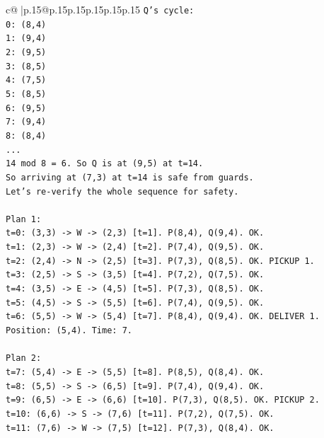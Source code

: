 \documentclass{article}
\begin{document}
{\begin{supertabular}{c@{$\;$}|p{.15\linewidth}@{}p{.15\linewidth}p{.15\linewidth}p{.15\linewidth}p{.15\linewidth}p{.15\linewidth}}
{{{\texttt{Q's cycle:} \\
\texttt{0: (8,4)} \\
\texttt{1: (9,4)} \\
\texttt{2: (9,5)} \\
\texttt{3: (8,5)} \\
\texttt{4: (7,5)} \\
\texttt{5: (8,5)} \\
\texttt{6: (9,5)} \\
\texttt{7: (9,4)} \\
\texttt{8: (8,4)} \\
\texttt{...} \\
\texttt{14 mod 8 = 6. So Q is at (9,5) at t=14.} \\
\texttt{So arriving at (7,3) at t=14 is safe from guards.} \\
\texttt{Let's re{-}verify the whole sequence for safety.} \\
\\ 
\texttt{Plan 1:} \\
\texttt{t=0: (3,3) {-}> W {-}> (2,3) {[}t=1{]}. P(8,4), Q(9,4). OK.} \\
\texttt{t=1: (2,3) {-}> W {-}> (2,4) {[}t=2{]}. P(7,4), Q(9,5). OK.} \\
\texttt{t=2: (2,4) {-}> N {-}> (2,5) {[}t=3{]}. P(7,3), Q(8,5). OK. PICKUP 1.} \\
\texttt{t=3: (2,5) {-}> S {-}> (3,5) {[}t=4{]}. P(7,2), Q(7,5). OK.} \\
\texttt{t=4: (3,5) {-}> E {-}> (4,5) {[}t=5{]}. P(7,3), Q(8,5). OK.} \\
\texttt{t=5: (4,5) {-}> S {-}> (5,5) {[}t=6{]}. P(7,4), Q(9,5). OK.} \\
\texttt{t=6: (5,5) {-}> W {-}> (5,4) {[}t=7{]}. P(8,4), Q(9,4). OK. DELIVER 1.} \\
\texttt{Position: (5,4). Time: 7.} \\
\\ 
\texttt{Plan 2:} \\
\texttt{t=7: (5,4) {-}> E {-}> (5,5) {[}t=8{]}. P(8,5), Q(8,4). OK.} \\
\texttt{t=8: (5,5) {-}> S {-}> (6,5) {[}t=9{]}. P(7,4), Q(9,4). OK.} \\
\texttt{t=9: (6,5) {-}> E {-}> (6,6) {[}t=10{]}. P(7,3), Q(8,5). OK. PICKUP 2.} \\
\texttt{t=10: (6,6) {-}> S {-}> (7,6) {[}t=11{]}. P(7,2), Q(7,5). OK.} \\
\texttt{t=11: (7,6) {-}> W {-}> (7,5) {[}t=12{]}. P(7,3), Q(8,4). OK.} \\
}}}
\end{supertabular}}
\end{document}
